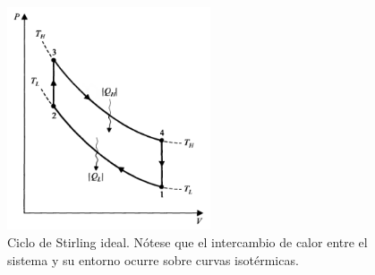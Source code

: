 \begin{itemize}
\begin{figure}
  \centering
  \includegraphics[width=6cm]{images/stirling-cycle.png}
  \caption{Ciclo de Stirling ideal. Nótese que el intercambio 
  de calor entre el sistema y su entorno ocurre sobre curvas
  isotérmicas.}
  \label{fig:diesel-cycle}
\end{figure}
\end{itemize}


































